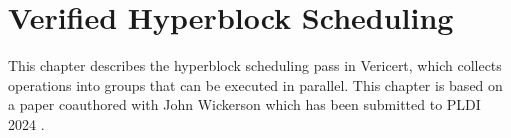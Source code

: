 \graphicspath{{./figures/5-hyperblock-scheduling/}}

\chapter{Verified Hyperblock Scheduling}%
\label{sec:hyperblock-scheduling}

\begin{chapsummary}
  This chapter describes the hyperblock scheduling pass in Vericert, which
  collects operations into groups that can be executed in parallel.  This
  chapter is based on a paper coauthored with John Wickerson which has been
  submitted to PLDI 2024 \cite[]{herklotz24_hsvhls}.
\end{chapsummary}




